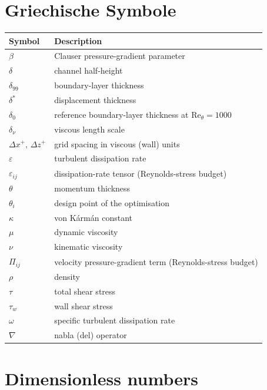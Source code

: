 \section*{Griechische Symbole}
\fi
\begin{longtable}[t]{@{}p{}p{}@{}}
    \textbf{Symbol} & \textbf{Description}\\
    \midrule
    \endhead
    $\beta$ & Clauser pressure-gradient parameter \\
    $\delta$ & channel half-height \\
    $\delta_{99}$ & boundary-layer thickness \\
    $\delta^*$ & displacement thickness \\
    $\delta_0$ & reference boundary-layer thickness at $\mathrm{Re}_\theta = 1000$ \\
    $\delta_\nu$ & viscous length scale \\
    $\Delta x^+,\,\Delta z^+$ & grid spacing in viscous (wall) units \\
    $\varepsilon$ & turbulent dissipation rate \\
    $\varepsilon_{ij}$ & dissipation-rate tensor (Reynolds-stress budget) \\
    $\theta$ & momentum thickness \\
    $\theta_i$ & design point of the optimisation \\
    $\kappa$ & von K\'arm\'an constant \\
    $\mu$ & dynamic viscosity \\
    $\nu$ & kinematic viscosity \\
    $\Pi_{ij}$ & velocity pressure-gradient term (Reynolds-stress budget) \\
    $\rho$ & density \\
    $\tau$ & total shear stress \\
    $\tau_w$ & wall shear stress \\
    $\omega$ & specific turbulent dissipation rate \\
    $\nabla$ & nabla (del) operator \\
\end{longtable}

\ifenglish
\section*{Dimensionless numbers}
\else
